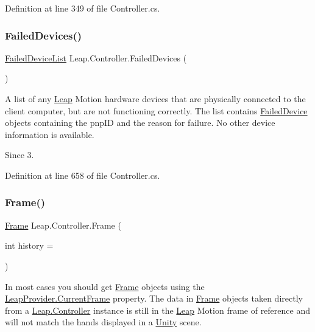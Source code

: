Definition at line 349 of file Controller.\+cs.

\mbox{\label{class_leap_1_1_controller_ab73815d54d49bf570371fe1ec39fe770}} 
\subsubsection{\texorpdfstring{FailedDevices()}{FailedDevices()}}
{\footnotesize\ttfamily \mbox{\hyperlink{class_leap_1_1_failed_device_list}{Failed\+Device\+List}} Leap.\+Controller.\+Failed\+Devices (\begin{DoxyParamCaption}{ }\end{DoxyParamCaption})}



A list of any \mbox{\hyperlink{namespace_leap}{Leap}} Motion hardware devices that are physically connected to the client computer, but are not functioning correctly. The list contains \mbox{\hyperlink{class_leap_1_1_failed_device}{Failed\+Device}} objects containing the pnp\+ID and the reason for failure. No other device information is available. 

\begin{DoxySince}{Since}
3. 
\end{DoxySince}


Definition at line 658 of file Controller.\+cs.

\mbox{\label{class_leap_1_1_controller_ac41dc9c50a3bd2a892cc44af0859ef0d}} 
\subsubsection{\texorpdfstring{Frame()}{Frame()}\hspace{0.1cm}{\footnotesize\ttfamily [1/2]}}
{\footnotesize\ttfamily \mbox{\hyperlink{class_leap_1_1_frame}{Frame}} Leap.\+Controller.\+Frame (\begin{DoxyParamCaption}\item[{int}]{history = {} }\end{DoxyParamCaption})}



In most cases you should get \mbox{\hyperlink{class_leap_1_1_frame}{Frame}} objects using the \mbox{\hyperlink{class_leap_1_1_unity_1_1_leap_provider_a9a5cf65099912311c37f340d3be7e454}{Leap\+Provider.\+Current\+Frame}} property. The data in \mbox{\hyperlink{class_leap_1_1_frame}{Frame}} objects taken directly from a \mbox{\hyperlink{class_leap_1_1_controller}{Leap.\+Controller}} instance is still in the \mbox{\hyperlink{namespace_leap}{Leap}} Motion frame of reference and will not match the hands displayed in a \mbox{\hyperlink{namespace_leap_1_1_unity}{Unity}} scene. 

